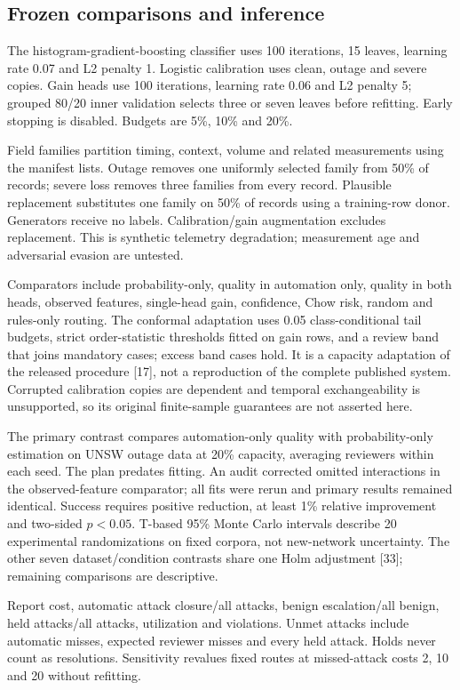 \documentclass[11pt,letterpaper]{article}
\begin{document}
\subsection{Frozen comparisons and inference}
The histogram-gradient-boosting classifier uses 100 iterations, 15 leaves, learning rate 0.07 and L2 penalty 1. Logistic calibration uses clean, outage and severe copies. Gain heads use 100 iterations, learning rate 0.06 and L2 penalty 5; grouped 80/20 inner validation selects three or seven leaves before refitting. Early stopping is disabled. Budgets are 5\%, 10\% and 20\%.

Field families partition timing, context, volume and related measurements using the manifest lists. Outage removes one uniformly selected family from 50\% of records; severe loss removes three families from every record. Plausible replacement substitutes one family on 50\% of records using a training-row donor. Generators receive no labels. Calibration/gain augmentation excludes replacement. This is synthetic telemetry degradation; measurement age and adversarial evasion are untested.

Comparators include probability-only, quality in automation only, quality in both heads, observed features, single-head gain, confidence, Chow risk, random and rules-only routing. The conformal adaptation uses 0.05 class-conditional tail budgets, strict order-statistic thresholds fitted on gain rows, and a review band that joins mandatory cases; excess band cases hold. It is a capacity adaptation of the released procedure {[}17{]}, not a reproduction of the complete published system. Corrupted calibration copies are dependent and temporal exchangeability is unsupported, so its original finite-sample guarantees are not asserted here.

The primary contrast compares automation-only quality with probability-only estimation on UNSW outage data at 20\% capacity, averaging reviewers within each seed. The plan predates fitting. An audit corrected omitted interactions in the observed-feature comparator; all fits were rerun and primary results remained identical. Success requires positive reduction, at least 1\% relative improvement and two-sided \(p<0.05\). T-based 95\% Monte Carlo intervals describe 20 experimental randomizations on fixed corpora, not new-network uncertainty. The other seven dataset/condition contrasts share one Holm adjustment {[}33{]}; remaining comparisons are descriptive.

Report cost, automatic attack closure/all attacks, benign escalation/all benign, held attacks/all attacks, utilization and violations. Unmet attacks include automatic misses, expected reviewer misses and every held attack. Holds never count as resolutions. Sensitivity revalues fixed routes at missed-attack costs 2, 10 and 20 without refitting.
\end{document}
